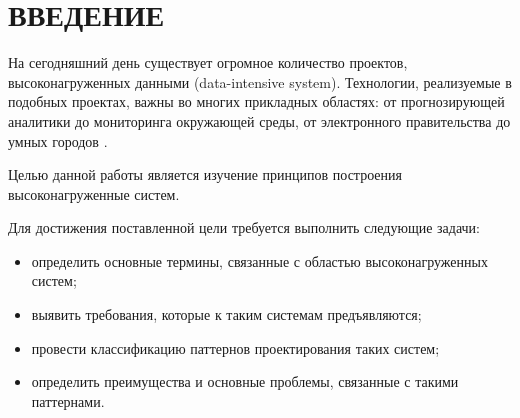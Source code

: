 \chapter*{ВВЕДЕНИЕ}

На сегодняшний день существует огромное
количество проектов, высоконагруженных данными
(data-intensive system). Технологии, реализуемые в
подобных проектах, важны во многих прикладных
областях: от прогнозирующей аналитики до
мониторинга окружающей среды, от электронного
правительства до умных городов \cite{intro}.

Целью данной работы является изучение принципов построения высоконагруженные систем.

Для достижения поставленной цели требуется выполнить следующие задачи:
\begin{itemize}
	\item определить основные термины, связанные с областью высоконагруженных систем;
	\item выявить требования, которые к таким системам предъявляются;
	\item провести классификацию паттернов проектирования таких систем;
	\item определить преимущества и основные проблемы, связанные с такими паттернами.
\end{itemize}